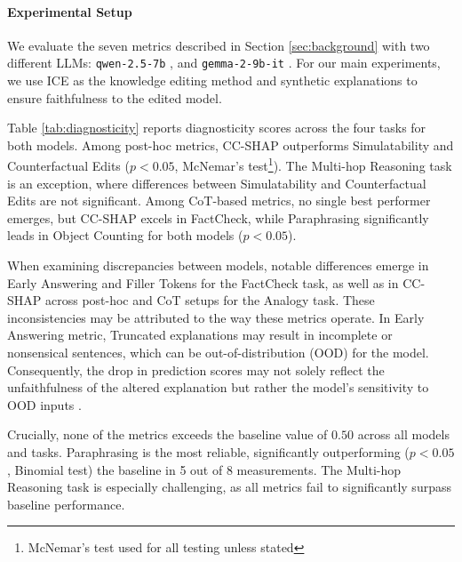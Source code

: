 

\paragraph{Experimental Setup} We evaluate the seven metrics described in Section \ref{sec:background} with two different LLMs: \texttt{qwen-2.5-7b} \citep{Yang2024Qwen25TR}, and \texttt{gemma-2-9b-it} \citep{Riviere2024Gemma2I}. For our main experiments, we use ICE as the knowledge editing method and synthetic explanations to ensure faithfulness to the edited model.

Table \ref{tab:diagnosticity} reports diagnosticity scores across the four tasks for both models. Among post-hoc metrics, CC-SHAP outperforms Simulatability and Counterfactual Edits ($p < 0.05$, McNemar’s test\footnote{McNemar’s test used for all testing unless stated}). The Multi-hop Reasoning task is an exception, where differences between Simulatability and Counterfactual Edits are not significant. Among CoT-based metrics, no single best performer emerges, but CC-SHAP excels in FactCheck, while Paraphrasing significantly leads in Object Counting for both models ($p < 0.05$).

When examining discrepancies between models, notable differences emerge in Early Answering and Filler Tokens for the FactCheck task, as well as in CC-SHAP across post-hoc and CoT setups for the Analogy task. These inconsistencies may be attributed to the way these metrics operate. In Early Answering metric, Truncated explanations may result in incomplete or nonsensical sentences, which can be out-of-distribution (OOD) for the model. Consequently, the drop in prediction scores may not solely reflect the unfaithfulness of the altered explanation but rather the model's sensitivity to OOD inputs \citep{Hooker2018ABF}. 

Crucially, none of the metrics exceeds the baseline value of $0.50$ across all models and tasks. Paraphrasing is the most reliable, significantly outperforming ($p < 0.05$, Binomial test) the baseline in 5 out of 8 measurements. The Multi-hop Reasoning task is especially challenging, as all metrics fail to significantly surpass baseline performance. 
